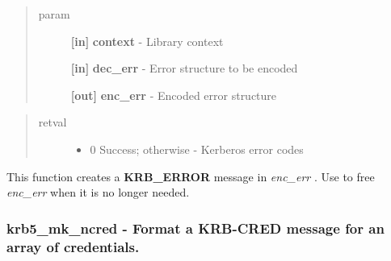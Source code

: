 \documentclass[letterpaper,10pt,english]{sphinxmanual}
\begin{document}
\begin{fulllineitems}
\label{appdev/refs/api/krb5_mk_error:c.krb5_mk_error}
\end{fulllineitems}

\begin{quote}\begin{description}
\item[{param}] \leavevmode
\textbf{{[}in{]}} \textbf{context} - Library context

\textbf{{[}in{]}} \textbf{dec\_err} - Error structure to be encoded

\textbf{{[}out{]}} \textbf{enc\_err} - Encoded error structure

\end{description}\end{quote}
\begin{quote}\begin{description}
\item[{retval}] \leavevmode\begin{itemize}
\item {} 
0   Success; otherwise - Kerberos error codes

\end{itemize}

\end{description}\end{quote}

This function creates a \textbf{KRB\_ERROR} message in \emph{enc\_err} . Use {\hyperref[appdev/refs/api/krb5_free_data_contents:c.krb5_free_data_contents]{}} to free \emph{enc\_err} when it is no longer needed.


\subsubsection{krb5\_mk\_ncred -  Format a KRB-CRED message for an array of credentials.}
\label{appdev/refs/api/krb5_mk_ncred::doc}\label{appdev/refs/api/krb5_mk_ncred:krb5-mk-ncred-format-a-krb-cred-message-for-an-array-of-credentials}
\end{document}
